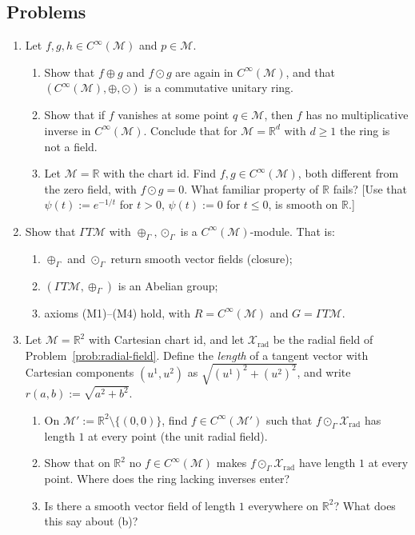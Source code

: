 \documentclass[11pt]{article}
\newcommand{\Cinf}{C^\infty(\mathcal M)}
\begin{document}
\subsection*{Problems}

\begin{enumerate}[label=\textbf{5.\arabic*}, leftmargin=2.2cm, start=7]

\item \label{prob:ring-of-functions}
Let $f,g,h\in\Cinf$ and $p\in\mathcal M$.
\begin{enumerate}[label=(\alph*)]
  \item Show that $f\oplus g$ and $f\odot g$ are again in $\Cinf$, and that
  $(\Cinf,\oplus,\odot)$ is a commutative unitary ring.
  \item Show that if $f$ vanishes at some point $q\in\mathcal M$, then $f$
  has no multiplicative inverse in $\Cinf$. Conclude that for $\mathcal
  M=\mathbb R^d$ with $d\ge1$ the ring is not a field.
  \item Let $\mathcal M=\mathbb R$ with the chart $\mathrm{id}$. Find
  $f,g\in\Cinf$, both different from the zero field, with $f\odot g=0$.
  What familiar property of $\mathbb R$ fails? [Use that
  $\psi(t):=e^{-1/t}$ for $t>0$, $\psi(t):=0$ for $t\le0$, is smooth on
  $\mathbb R$.]
\end{enumerate}

\item \label{prob:module-axioms}
Show that $\Gamma T\mathcal M$ with $\oplus_\Gamma,\odot_\Gamma$ is a
$\Cinf$-module. That is:
\begin{enumerate}[label=(\alph*)]
  \item $\oplus_\Gamma$ and $\odot_\Gamma$ return smooth vector fields
  (closure);
  \item $(\Gamma T\mathcal M,\oplus_\Gamma)$ is an Abelian group;
  \item axioms (M1)--(M4) hold, with $R=\Cinf$ and $G=\Gamma T\mathcal M$.
\end{enumerate}

\item \label{prob:unit-radial}
Let $\mathcal M=\mathbb R^2$ with Cartesian chart $\mathrm{id}$, and let
$\mathcal X_{\mathrm{rad}}$ be the radial field of
Problem~\ref{prob:radial-field}. Define the \emph{length} of a tangent
vector with Cartesian components $(u^1,u^2)$ as
$\sqrt{(u^1)^2+(u^2)^2}$, and write $r(a,b):=\sqrt{a^2+b^2}$.
\begin{enumerate}[label=(\alph*)]
  \item On $\mathcal M':=\mathbb R^2\setminus\{(0,0)\}$, find
  $f\in C^\infty(\mathcal M')$ such that $f\odot_\Gamma\mathcal
  X_{\mathrm{rad}}$ has length $1$ at every point (the unit radial field).
  \item Show that on $\mathbb R^2$ no $f\in\Cinf$ makes $f\odot_\Gamma
  \mathcal X_{\mathrm{rad}}$ have length $1$ at every point. Where does the
  ring lacking inverses enter?
  \item Is there a smooth vector field of length $1$ everywhere on
  $\mathbb R^2$? What does this say about (b)?
\end{enumerate}


\end{enumerate}
\end{document}
